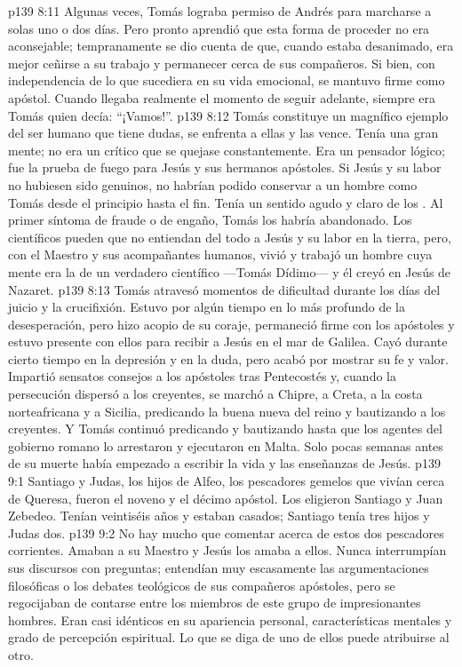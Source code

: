 \vs p139 8:11 Algunas veces, Tomás lograba permiso de Andrés para marcharse a solas uno o dos días. Pero pronto aprendió que esta forma de proceder no era aconsejable; tempranamente se dio cuenta de que, cuando estaba desanimado, era mejor ceñirse a su trabajo y permanecer cerca de sus compañeros. Si bien, con independencia de lo que sucediera en su vida emocional, se mantuvo firme como apóstol. Cuando llegaba realmente el momento de seguir adelante, siempre era Tomás quien decía: “¡Vamos!”.
\vs p139 8:12 Tomás constituye un magnífico ejemplo del ser humano que tiene dudas, se enfrenta a ellas y las vence. Tenía una gran mente; no era un crítico que se quejase constantemente. Era un pensador lógico; fue la prueba de fuego para Jesús y sus hermanos apóstoles. Si Jesús y su labor no hubiesen sido genuinos, no habrían podido conservar a un hombre como Tomás desde el principio hasta el fin. Tenía un sentido agudo y claro de los . Al primer síntoma de fraude o de engaño, Tomás los habría abandonado. Los científicos pueden que no entiendan del todo a Jesús y su labor en la tierra, pero, con el Maestro y sus acompañantes humanos, vivió y trabajó un hombre cuya mente era la de un verdadero científico ---Tomás Dídimo--- y él creyó en Jesús de Nazaret.
\vs p139 8:13 \pc Tomás atravesó momentos de dificultad durante los días del juicio y la crucifixión. Estuvo por algún tiempo en lo más profundo de la desesperación, pero hizo acopio de su coraje, permaneció firme con los apóstoles y estuvo presente con ellos para recibir a Jesús en el mar de Galilea. Cayó durante cierto tiempo en la depresión y en la duda, pero acabó por mostrar su fe y valor. Impartió sensatos consejos a los apóstoles tras Pentecostés y, cuando la persecución dispersó a los creyentes, se marchó a Chipre, a Creta, a la costa norteafricana y a Sicilia, predicando la buena nueva del reino y bautizando a los creyentes. Y Tomás continuó predicando y bautizando hasta que los agentes del gobierno romano lo arrestaron y ejecutaron en Malta. Solo pocas semanas antes de su muerte había empezado a escribir la vida y las enseñanzas de Jesús.
\vs p139 9:1 Santiago y Judas, los hijos de Alfeo, los pescadores gemelos que vivían cerca de Queresa, fueron el noveno y el décimo apóstol. Los eligieron Santiago y Juan Zebedeo. Tenían veintiséis años y estaban casados; Santiago tenía tres hijos y Judas dos.
\vs p139 9:2 \pc No hay mucho que comentar acerca de estos dos pescadores corrientes. Amaban a su Maestro y Jesús los amaba a ellos. Nunca interrumpían sus discursos con preguntas; entendían muy escasamente las argumentaciones filosóficas o los debates teológicos de sus compañeros apóstoles, pero se regocijaban de contarse entre los miembros de este grupo de impresionantes hombres. Eran casi idénticos en su apariencia personal, características mentales y grado de percepción espiritual. Lo que se diga de uno de ellos puede atribuirse al otro.
